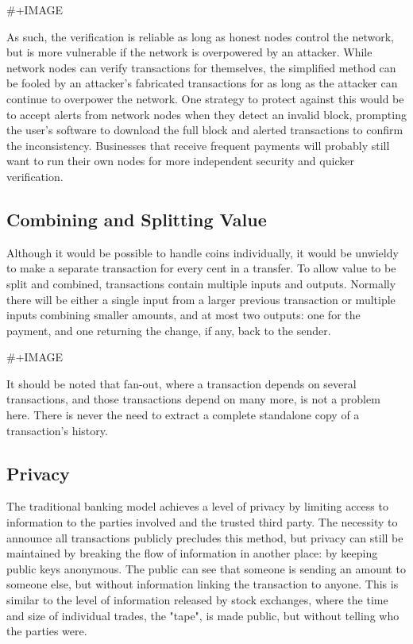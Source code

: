 \documentclass[11pt]{article}
\begin{document}
\#+IMAGE

As such, the verification is reliable as long as honest nodes control the network, but is more vulnerable if the network is overpowered by an attacker.
While network nodes can verify transactions for themselves, the simplified method can be fooled by an attacker's fabricated transactions for as long as the attacker can continue to overpower the network.
One strategy to protect against this would be to accept alerts from network nodes when they detect an invalid block, prompting the user's software to download the full block and alerted transactions to confirm the inconsistency.
Businesses that receive frequent payments will probably still want to run their own nodes for more independent security and quicker verification.

\subsection{Combining and Splitting Value}
\label{sec:org4bbd872}
Although it would be possible to handle coins individually, it would be unwieldy to make a separate transaction for every cent in a transfer.
To allow value to be split and combined, transactions contain multiple inputs and outputs.
Normally there will be either a single input from a larger previous transaction or multiple inputs combining smaller amounts, and at most two outputs: one for the payment, and one returning the change, if any, back to the sender.

\#+IMAGE

It should be noted that fan-out, where a transaction depends on several transactions, and those transactions depend on many more, is not a problem here.
There is never the need to extract a complete standalone copy of a transaction's history.

\subsection{Privacy}
\label{sec:org4888c33}
The traditional banking model achieves a level of privacy by limiting access to information to the parties involved and the trusted third party.
The necessity to announce all transactions publicly precludes this method, but privacy can still be maintained by breaking the flow of information in another place: by keeping public keys anonymous.
The public can see that someone is sending an amount to someone else, but without information linking the transaction to anyone.
This is similar to the level of information released by stock exchanges, where the time and size of individual trades, the "tape", is made public, but without telling who the parties were.
\end{document}

